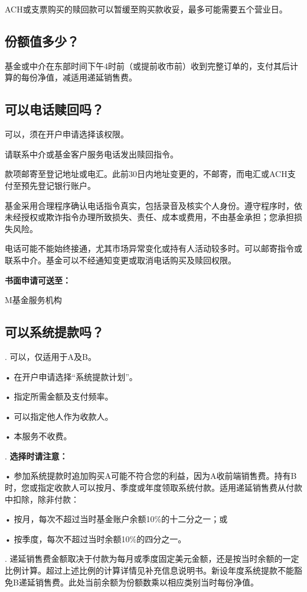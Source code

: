 \documentclass[UTF8,fontset=none,11pt,a4paper]{ctexart}
\begin{document}
ACH或支票购买的赎回款可以暂缓至购买款收妥，最多可能需要五\allowbreak\mbox{个营业日。}

\subsection*{份额值多少？}
基金或中介在东部时间下午4时前（或提前收市前）收到完整订单的，支付其后计算的每份净值，减适用递\allowbreak\mbox{延销售费。}

\subsection*{可以电话赎回吗？}
可以，须在开户申请选\allowbreak\mbox{择该权限。}

请联系中介或基金客户服务电话发出赎\allowbreak\mbox{回指令。}

款项邮寄至登记地址或电汇。此前30日内地址变更的，不邮寄，而电汇或ACH支付至预先登记\allowbreak\mbox{银行账户。}

基金采用合理程序确认电话指令真实，包括录音及核实个人身份。遵守程序时，依未经授权或欺诈指令办理所致损失、责任、成本或费用，不由基金承担；您承担\allowbreak\mbox{损失风险。}

电话可能不能始终接通，尤其市场异常变化或持有人活动较多时。可以邮寄指令或联系中介。基金可以不经通知变更或取消电话购买及\allowbreak\mbox{赎回权限。}

\textbf{书面申请可送至：}

\noindent M基金\allowbreak\mbox{服务机构}\par\smallskip
\subsection*{可以系统提款吗？}
. 可以，仅适用于A及B。


\noindent • 在开户申请选择“系统\allowbreak\mbox{提款计划”。}\par\smallskip
\noindent • 指定所需金额及\allowbreak\mbox{支付频率。}\par\smallskip
\noindent • 可以指定他人作\allowbreak\mbox{为收款人。}\par\smallskip
\noindent • 本服\allowbreak\mbox{务不收费。}\par\smallskip
{}. \textbf{选择时请注意：}


\noindent • 参加系统提款时追加购买A可能不符合您的利益，因为A收前端销售费。持有B时，您或指定收款人可以按月、季度或年度领取系统付款。适用递延销售费从付款中扣除，\allowbreak\mbox{除非付款：}\par\smallskip
\noindent • 按月，每次不超过当时基金账户余额10\%的十二分之一；或\par\smallskip
\noindent • 按季度，每次不超过当时余额10\%的\allowbreak\mbox{四分之一。}\par\smallskip
{}. 递延销售费金额取决于付款为每月或季度固定美元金额，还是按当时余额的一定比例计算。超过上述比例的计算详情见补充信息说明书。新设年度系统提款不能豁免B递延销售费。此处当前余额为份额数乘以相应类别当时\allowbreak\mbox{每份净值。}
\end{document}
